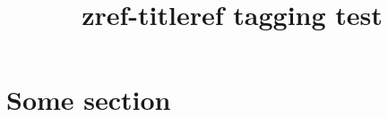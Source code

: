 \documentclass{acmart}
\title{zref-titleref tagging test}
\begin{document}
\section{Some section}

\end{document}
